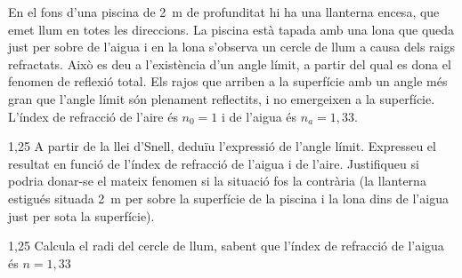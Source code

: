 En el fons d'una piscina de 2~m de profunditat hi ha una llanterna encesa, que emet llum en totes les direccions. La piscina està tapada amb una lona que queda just per sobre de l'aigua i en la lona s'observa un cercle de llum a causa dels raigs refractats. Això es deu a l'existència d'un angle límit, a partir del qual es dona el fenomen de reflexió total. Els rajos que arriben a la superfície amb un angle més gran que l'angle límit són plenament reflectits, i no emergeixen a la superfície. L'índex de refracció de l'aire és $n_0=1$ i de l'aigua és $n_a=1,33$.


\begin{apartat}{1,25}
A partir de la llei d'Snell, deduïu l'expressió de l'angle límit. Expresseu el resultat en funció de l'índex de refracció de l'aigua i de l'aire. Justifiqueu si podria donar-se el mateix fenomen si la situació fos la contrària (la llanterna estigués situada 2~m per sobre la superfície de la piscina i la lona dins de l'aigua just per sota la superfície).
\end{apartat}

\begin{apartat}{1,25}
Calcula el radi del cercle de llum, sabent que l'índex de refracció de l'aigua és $n=1,33$
\end{apartat}
